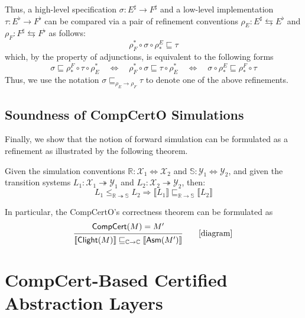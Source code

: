 \documentclass[acmsmall,review,anonymous]{acmart}\settopmatter{printfolios=true,printccs=false,printacmref=false}
\begin{document}
Thus, a high-level specification
$\sigma: E^\sharp \rightarrow F^\sharp$
and a low-level implementation
$\tau: E^\flat \rightarrow F^\flat$
can be compared
via a pair of refinement conventions
$\rho_E: E^\sharp \leftrightarrows E^\flat$
and $\rho_F: F^\sharp \leftrightarrows F^\flat$
as follows:
\[
  \rho_F^* \circ \sigma \circ \rho_*^E \sqsubseteq \tau
\]
which, by the property of adjunctions,
is equivalent to the following forms
\[
  \sigma \sqsubseteq \rho_*^F \circ \tau \circ \rho^*_E
  \quad \Leftrightarrow \quad
  \rho_F^* \circ \sigma \sqsubseteq \tau \circ \rho^*_E
  \quad \Leftrightarrow \quad
  \sigma \circ \rho_*^E \sqsubseteq \rho_*^F \circ \tau
\]
Thus, we use the notation
$\sigma \sqsubseteq_{\rho_E \rightarrow \rho_F} \tau$
to denote one of the above refinements.


\subsection{Soundness of CompCertO Simulations} %

Finally, we show that the notion of forward simulation can be formulated as a
refinement as illustrated by the following theorem.
\begin{theorem}
  Given the simulation conventions $\mathbb{R} : \mathcal{X}_1 \Leftrightarrow \mathcal{X}_2$ and
  $\mathbb{S} : \mathcal{Y}_1 \Leftrightarrow \mathcal{Y}_2$, and given the transition systems
  $L_1: \mathcal{X}_1 \twoheadrightarrow \mathcal{Y}_1$ and
  $L_2: \mathcal{X}_2 \twoheadrightarrow \mathcal{Y}_2$, then:
  \[
    L_1 \le_{\mathbb{R} \twoheadrightarrow \mathbb{S}} L_2 \Rightarrow
    \llbracket L_1 \rrbracket
    \sqsubseteq_{\mathbb{R} \rightarrow \mathbb{S}}
    \llbracket L_2 \rrbracket
  \]
\end{theorem}

In particular, the CompCertO's correctness theorem can be formulated as
\[
  \begin{prooftree}
    \hypo{\kw{CompCert}(M) = M'}
    \infer1{
      \llbracket \kw{Clight}(M) \rrbracket
      \sqsubseteq_{\mathbb{C} \rightarrow \mathbb{C}}
      \llbracket \kw{Asm}(M') \rrbracket}
  \end{prooftree}
  \qquad
  \mbox{[diagram]}
\]


\section{CompCert-Based Certified Abstraction Layers} \label{sec:compcert-cal} %
\end{document}

